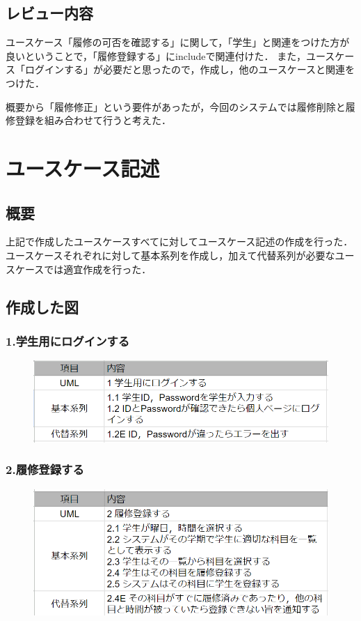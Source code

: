 \documentclass[documentclass]{jsarticle}
\begin{document}
\subsection*{レビュー内容}
ユースケース「履修の可否を確認する」に関して，「学生」と関連をつけた方が良いということで，「履修登録する」にincludeで関連付けた．
また，ユースケース「ログインする」が必要だと思ったので，作成し，他のユースケースと関連をつけた．

概要から「履修修正」という要件があったが，今回のシステムでは履修削除と履修登録を組み合わせて行うと考えた．

\newpage

\section{ユースケース記述}
\subsection*{概要}
上記で作成したユースケースすべてに対してユースケース記述の作成を行った．
ユースケースそれぞれに対して基本系列を作成し，加えて代替系列が必要なユースケースでは適宜作成を行った．

\subsection*{作成した図}
\subsubsection*{1.学生用にログインする}
\begin{figure}[H]
  \includegraphics*[scale=0.4]{figure/4-1.png}
\end{figure}

\subsubsection*{2.履修登録する}
\begin{figure}[H]
  \includegraphics*[scale=0.4]{figure/4-2.png}
\end{figure}
\end{document}
